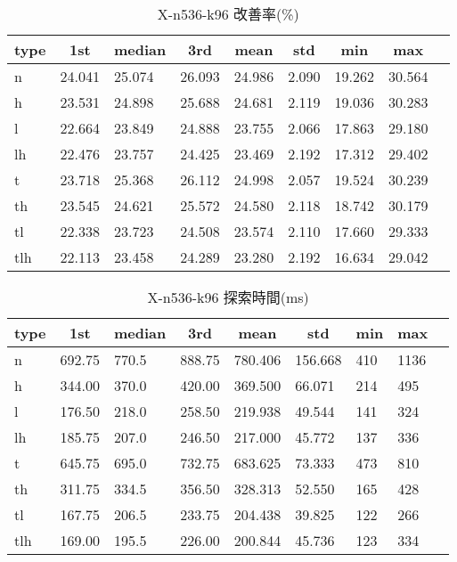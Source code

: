 \begin{table}[htbp]
    \centering
    \caption{X-n536-k96 改善率(\%)}
    \begin{tabular}{|l|l|l|l|l|l|l|l|l|}\hline
    \multicolumn{1}{|c|}{\textbf{type}}
    &\multicolumn{1}{|c|}{\textbf{1st}}
    &\multicolumn{1}{c|}{\textbf{median}}
    &\multicolumn{1}{c|}{\textbf{3rd}}
    &\multicolumn{1}{c|}{\textbf{mean}}
    &\multicolumn{1}{c|}{\textbf{std}}
    &\multicolumn{1}{c|}{\textbf{min}}
    &\multicolumn{1}{c|}{\textbf{max}}\\\hline
	n & 24.041 & 25.074 & 26.093 & 24.986 & 2.090 & 19.262 & 30.564\\\hline
	h & 23.531 & 24.898 & 25.688 & 24.681 & 2.119 & 19.036 & 30.283\\\hline
	l & 22.664 & 23.849 & 24.888 & 23.755 & 2.066 & 17.863 & 29.180\\\hline
	lh & 22.476 & 23.757 & 24.425 & 23.469 & 2.192 & 17.312 & 29.402\\\hline
	t & 23.718 & 25.368 & 26.112 & 24.998 & 2.057 & 19.524 & 30.239\\\hline
	th & 23.545 & 24.621 & 25.572 & 24.580 & 2.118 & 18.742 & 30.179\\\hline
	tl & 22.338 & 23.723 & 24.508 & 23.574 & 2.110 & 17.660 & 29.333\\\hline
	tlh & 22.113 & 23.458 & 24.289 & 23.280 & 2.192 & 16.634 & 29.042\\\hline
	\end{tabular}
\end{table}
\begin{table}[htbp]
    \centering
    \caption{X-n536-k96 探索時間(ms)}
    \begin{tabular}{|l|l|l|l|l|l|l|l|l|}\hline
    \multicolumn{1}{|c|}{\textbf{type}}
    &\multicolumn{1}{|c|}{\textbf{1st}}
    &\multicolumn{1}{c|}{\textbf{median}}
    &\multicolumn{1}{c|}{\textbf{3rd}}
    &\multicolumn{1}{c|}{\textbf{mean}}
    &\multicolumn{1}{c|}{\textbf{std}}
    &\multicolumn{1}{c|}{\textbf{min}}
    &\multicolumn{1}{c|}{\textbf{max}}\\\hline
	n & 692.75 & 770.5 & 888.75 & 780.406 & 156.668 & 410 & 1136\\\hline
	h & 344.00 & 370.0 & 420.00 & 369.500 & 66.071 & 214 & 495\\\hline
	l & 176.50 & 218.0 & 258.50 & 219.938 & 49.544 & 141 & 324\\\hline
	lh & 185.75 & 207.0 & 246.50 & 217.000 & 45.772 & 137 & 336\\\hline
	t & 645.75 & 695.0 & 732.75 & 683.625 & 73.333 & 473 & 810\\\hline
	th & 311.75 & 334.5 & 356.50 & 328.313 & 52.550 & 165 & 428\\\hline
	tl & 167.75 & 206.5 & 233.75 & 204.438 & 39.825 & 122 & 266\\\hline
	tlh & 169.00 & 195.5 & 226.00 & 200.844 & 45.736 & 123 & 334\\\hline
	\end{tabular}
\end{table}
